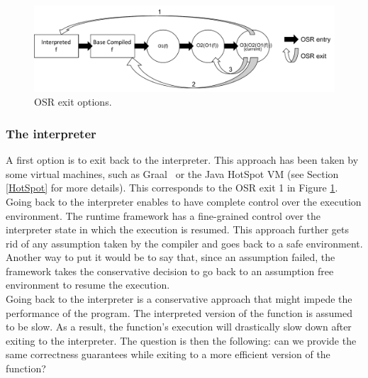 \begin{figure}[h]
\centering
\includegraphics[scale=0.5]{Figures/wheretoexit}
\decoRule
\caption[OSR exit options]{OSR exit options.}
\label{OSR exit options}
\end{figure}

\subsubsection{The interpreter}
A first option is to exit back to the interpreter. 
This approach has been taken by some virtual machines, such as Graal~\cite{duboscq2014speculation} or the Java HotSpot VM\cite{paleczny2001java} (see Section \ref{HotSpot} for more details).
This corresponds to the OSR exit 1 in Figure \ref{OSR exit options}.\\

Going back to the interpreter enables to have complete control over the execution environment.
The runtime framework has a fine-grained control over the interpreter state in which the execution is resumed.
This approach further gets rid of any assumption taken by the compiler and goes back to a safe environment.
Another way to put it would be to say that, since an assumption failed, the framework takes the conservative decision to go back to an assumption free environment to resume the execution.\\

Going back to the interpreter is a conservative approach that might impede the performance of the program.
The interpreted version of the function is assumed to be slow.
As a result, the function's execution will drastically slow down after exiting to the interpreter.
The question is then the following: can we provide the same correctness guarantees while exiting to a more efficient version of the function?\\

